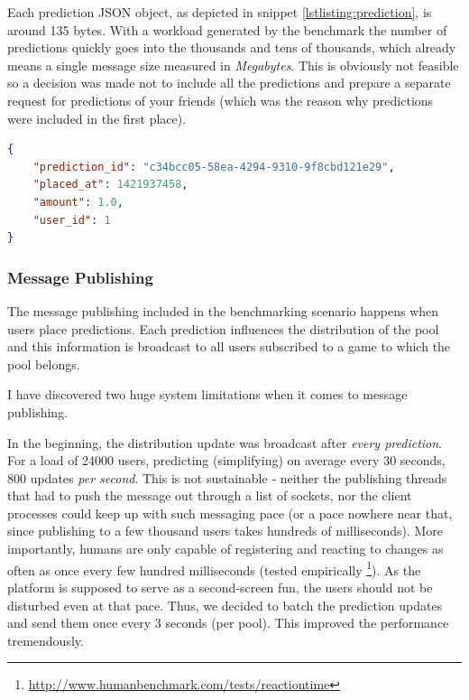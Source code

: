 \documentclass{uvamscse}
\begin{document}
Each prediction JSON object, as depicted in snippet \ref{lstlisting:prediction}, is around 135 bytes. With a workload generated by the benchmark the number of predictions quickly goes into the thousands and tens of thousands, which already means a single message size measured in \textit{Megabytes}. This is obviously not feasible so a decision was made not to include all the predictions and prepare a separate request for predictions of your friends (which was the reason why predictions were included in the first place).

\begin{sourcecode}[H]
\begin{lstlisting}[style=mono,language=json]
{
    "prediction_id": "c34bcc05-58ea-4294-9310-9f8cbd121e29",
    "placed_at": 1421937458,
    "amount": 1.0,
    "user_id": 1
}
\end{lstlisting}
\caption{Single prediction JSON object.}
\label{lstlisting:prediction}
\end{sourcecode}

\subsubsection{Message Publishing}
The message publishing included in the benchmarking scenario happens when users place predictions. Each prediction influences the distribution of the pool and this information is broadcast to all users subscribed to a game to which the pool belongs.

I have discovered two huge system limitations when it comes to message publishing.

In the beginning, the distribution update was broadcast after \textit{every prediction}. For a load of 24000 users, predicting (simplifying) on average every 30 seconds, 800 updates \textit{per second}. This is not sustainable - neither the publishing threads that had to push the message out through a list of sockets, nor the client processes could keep up with such messaging pace (or a pace nowhere near that, since publishing to a few thousand users takes hundreds of milliseconds). More importantly, humans are only capable of registering and reacting to changes as often as once every few hundred milliseconds (tested empirically \footnote{\url{http://www.humanbenchmark.com/tests/reactiontime}}). As the platform is supposed to serve as a second-screen fun, the users should not be disturbed even at that pace. Thus, we decided to batch the prediction updates and send them once every 3 seconds (per pool). This improved the performance tremendously.
\end{document}

